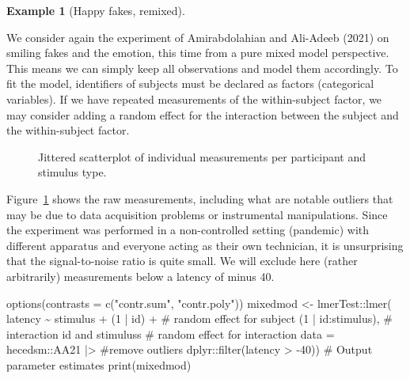 \documentclass[
  11pt,
  letterpaper,
]{scrbook}
\newenvironment{Shaded}{\begin{snugshade}}{\end{snugshade}}
\newcommand{\AttributeTok}[1]{\textcolor[rgb]{0.40,0.45,0.13}{#1}}
\newcommand{\CommentTok}[1]{\textcolor[rgb]{0.37,0.37,0.37}{#1}}
\newcommand{\DecValTok}[1]{\textcolor[rgb]{0.68,0.00,0.00}{#1}}
\newcommand{\FunctionTok}[1]{\textcolor[rgb]{0.28,0.35,0.67}{#1}}
\newcommand{\NormalTok}[1]{\textcolor[rgb]{0.00,0.23,0.31}{#1}}
\newcommand{\OtherTok}[1]{\textcolor[rgb]{0.00,0.23,0.31}{#1}}
\newcommand{\SpecialCharTok}[1]{\textcolor[rgb]{0.37,0.37,0.37}{#1}}
\newcommand{\StringTok}[1]{\textcolor[rgb]{0.13,0.47,0.30}{#1}}
\theoremstyle{definition}
\theoremstyle{definition}
\newtheorem{example}{Example}[chapter]
\theoremstyle{remark}
\begin{document}
\begin{example}[Happy fakes,
remixed]\protect\hypertarget{exm-happy-fakes-revisited}{}\label{exm-happy-fakes-revisited}

We consider again the experiment of Amirabdolahian and Ali-Adeeb (2021)
on smiling fakes and the emotion, this time from a pure mixed model
perspective. This means we can simply keep all observations and model
them accordingly. To fit the model, identifiers of subjects must be
declared as factors (categorical variables). If we have repeated
measurements of the within-subject factor, we may consider adding a
random effect for the interaction between the subject and the
within-subject factor.

\begin{figure}[ht!]


\caption{\label{fig-aafulldat}Jittered scatterplot of individual
measurements per participant and stimulus type.}

\end{figure}%

Figure~\ref{fig-aafulldat} shows the raw measurements, including what
are notable outliers that may be due to data acquisition problems or
instrumental manipulations. Since the experiment was performed in a
non-controlled setting (pandemic) with different apparatus and everyone
acting as their own technician, it is unsurprising that the
signal-to-noise ratio is quite small. We will exclude here (rather
arbitrarily) measurements below a latency of minus 40.

\begin{Shaded}
\begin{Highlighting}[]
\FunctionTok{options}\NormalTok{(}\AttributeTok{contrasts =} \FunctionTok{c}\NormalTok{(}\StringTok{"contr.sum"}\NormalTok{, }\StringTok{"contr.poly"}\NormalTok{))}
\NormalTok{mixedmod }\OtherTok{\textless{}{-}}\NormalTok{ lmerTest}\SpecialCharTok{::}\FunctionTok{lmer}\NormalTok{(}
\NormalTok{  latency }\SpecialCharTok{\textasciitilde{}}\NormalTok{ stimulus }\SpecialCharTok{+} 
\NormalTok{    (}\DecValTok{1} \SpecialCharTok{|}\NormalTok{ id) }\SpecialCharTok{+} \CommentTok{\# random effect for subject}
\NormalTok{    (}\DecValTok{1} \SpecialCharTok{|}\NormalTok{ id}\SpecialCharTok{:}\NormalTok{stimulus), }\CommentTok{\# interaction id and stimuluss}
  \CommentTok{\# random effect for interaction }
  \AttributeTok{data =}\NormalTok{ hecedsm}\SpecialCharTok{::}\NormalTok{AA21 }\SpecialCharTok{|\textgreater{}} \CommentTok{\#remove outliers}
\NormalTok{    dplyr}\SpecialCharTok{::}\FunctionTok{filter}\NormalTok{(latency }\SpecialCharTok{\textgreater{}} \SpecialCharTok{{-}}\DecValTok{40}\NormalTok{))}
\CommentTok{\# Output parameter estimates}
\FunctionTok{print}\NormalTok{(mixedmod)}
\end{Highlighting}
\end{Shaded}


\end{example}
\end{document}
